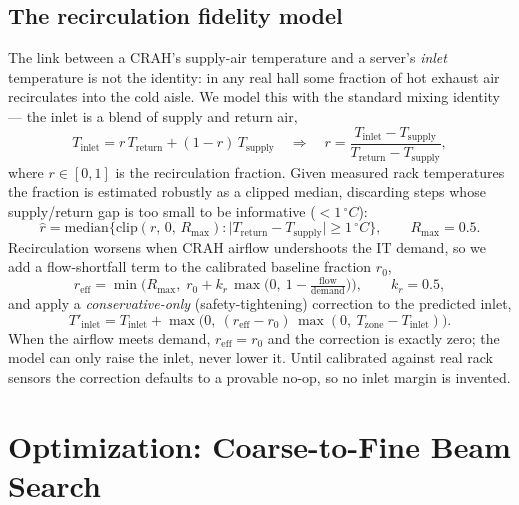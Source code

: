 \documentclass[11pt]{article}
\newcommand{\degC}{\ensuremath{^{\circ}}C}
\begin{document}
\subsection{The recirculation fidelity model}
\label{sec:recirc}
The link between a CRAH's supply-air temperature and a server's \emph{inlet} temperature is
not the identity: in any real hall some fraction of hot exhaust air recirculates into the
cold aisle. We model this with the standard mixing identity --- the inlet is a blend of
supply and return air,
\begin{equation}
T_{\mathrm{inlet}} = r\,T_{\mathrm{return}} + (1-r)\,T_{\mathrm{supply}}
\quad\Longrightarrow\quad
r = \frac{T_{\mathrm{inlet}} - T_{\mathrm{supply}}}{T_{\mathrm{return}} - T_{\mathrm{supply}}},
\label{eq:mixing}
\end{equation}
where \(r\in[0,1]\) is the recirculation fraction. Given measured rack temperatures the
fraction is estimated robustly as a clipped median, discarding steps whose supply/return
gap is too small to be informative (\(<1\,\degC\)):
\begin{equation}
\widehat{r} = \mathrm{median}\Big\{\mathrm{clip}(r,\,0,\,R_{\max}) :
\lvert T_{\mathrm{return}} - T_{\mathrm{supply}}\rvert \ge 1\,\degC\Big\},
\qquad R_{\max}=0.5.
\label{eq:rhat}
\end{equation}
Recirculation worsens when CRAH airflow undershoots the IT demand, so we add a
flow-shortfall term to the calibrated baseline fraction \(r_0\),
\begin{equation}
r_{\mathrm{eff}} = \min\!\Big(R_{\max},\; r_0 + k_r\,\max\!\big(0,\ 1 - \tfrac{\mathrm{flow}}{\mathrm{demand}}\big)\Big),
\qquad k_r=0.5,
\label{eq:reff}
\end{equation}
and apply a \emph{conservative-only} (safety-tightening) correction to the predicted
inlet,
\begin{equation}
T'_{\mathrm{inlet}} = T_{\mathrm{inlet}} + \max\!\Big(0,\ (r_{\mathrm{eff}}-r_0)\,\max(0,\ T_{\mathrm{zone}} - T_{\mathrm{inlet}})\Big).
\label{eq:recirccorr}
\end{equation}
When the airflow meets demand, \(r_{\mathrm{eff}}=r_0\) and the correction is exactly zero;
the model can only raise the inlet, never lower it. Until calibrated against real rack
sensors the correction defaults to a provable no-op, so no inlet margin is invented.

\section{Optimization: Coarse-to-Fine Beam Search}
\label{sec:search}
\end{document}

